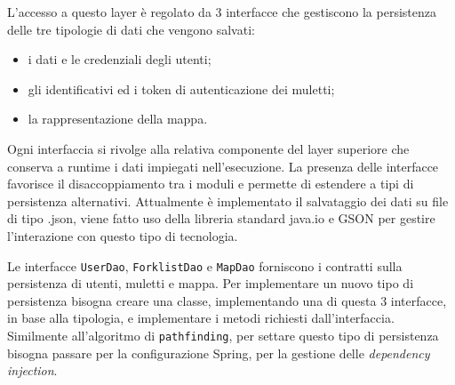 L'accesso a questo layer è regolato da 3 interfacce che gestiscono la persistenza delle tre tipologie di dati che vengono salvati:
\begin{itemize}
	\item i dati e le credenziali degli utenti;
	\item gli identificativi ed i token di autenticazione dei muletti;
	\item la rappresentazione della mappa.
\end{itemize}

Ogni interfaccia si rivolge alla relativa componente del layer superiore che conserva a runtime i dati impiegati nell'esecuzione. La presenza delle interfacce favorisce il disaccoppiamento tra i moduli e permette di estendere a tipi di persistenza alternativi. Attualmente è implementato il salvataggio dei dati su file di tipo .json, viene fatto uso della libreria standard java.io e GSON per gestire l'interazione con questo tipo di tecnologia.

        Le interfacce \texttt{UserDao}, \texttt{ForklistDao} e \texttt{MapDao} forniscono i contratti sulla persistenza di utenti, muletti e mappa. Per implementare un nuovo tipo di persistenza bisogna creare una classe, implementando una di questa 3 interfacce, in base alla tipologia, e implementare i metodi richiesti dall'interfaccia.
        Similmente all'algoritmo di \texttt{pathfinding}, per settare questo tipo di persistenza bisogna passare per la configurazione Spring, per la gestione delle \textit{dependency injection}.


\pagebreak
